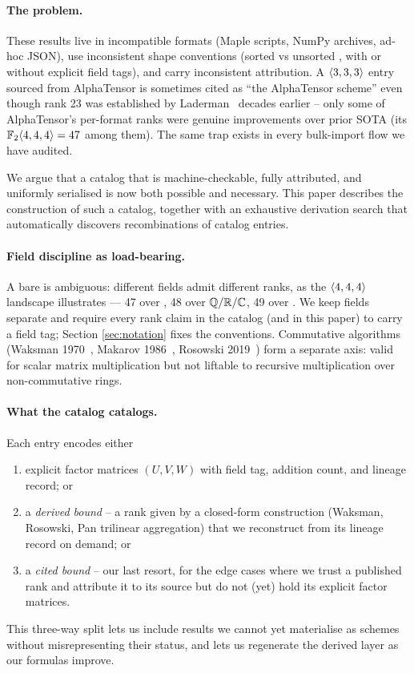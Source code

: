 \paragraph{The problem.} These results live in incompatible formats
(Maple scripts, NumPy archives, ad-hoc JSON), use inconsistent shape
conventions (sorted vs unsorted , with or without
explicit field tags), and carry inconsistent attribution. A
\(\langle 3, 3, 3 \rangle\) entry sourced from AlphaTensor is sometimes
cited as ``the AlphaTensor scheme'' even though rank 23 was established
by Laderman~\cite{laderman1976} decades earlier -- only some of
AlphaTensor's per-format ranks were genuine improvements over prior
SOTA (its \(\mathbb{F}_2\langle 4, 4, 4 \rangle=47\) among them). The same trap
exists in every bulk-import flow we have audited.

We argue that a catalog that is machine-checkable, fully
attributed, and uniformly serialised is now both possible and
necessary. This paper describes the construction of such a catalog,
together with an exhaustive derivation search that automatically discovers
recombinations of catalog entries.

\paragraph{Field discipline as load-bearing.} A bare 
is ambiguous: different fields admit different ranks, as the
\(\langle 4, 4, 4 \rangle\) landscape illustrates --- 47 over \Ftwo, 48
over \(\mathbb{Q}/\mathbb{R}/\mathbb{C}\), 49 over \Integers. We keep fields
separate and require every rank claim in the catalog (and in
this paper) to carry a field tag; Section \ref{sec:notation} fixes
the conventions. Commutative algorithms (Waksman
1970~\cite{waksman1970}, Makarov 1986~\cite{makarov1986}, Rosowski
2019~\cite{rosowski2019}) form a separate axis: valid for scalar
matrix multiplication but not liftable to recursive multiplication
over non-commutative rings.

\paragraph{What the catalog catalogs.} Each entry encodes either
\begin{enumerate}[label=(\alph*)]
  \item explicit factor matrices \((U, V, W)\) with field tag,
    addition count, and lineage record; or
  \item a \emph{derived bound} -- a rank given by a closed-form
    construction (Waksman, Rosowski, Pan trilinear aggregation) that we
    reconstruct from its lineage record on demand; or
  \item a \emph{cited bound} -- our last resort, for the edge cases
    where we trust a published rank and attribute it to its source but
    do not (yet) hold its explicit factor matrices.
\end{enumerate}
This three-way split lets us include results we cannot yet
materialise as schemes without misrepresenting their status, and lets
us regenerate the derived layer as our formulas improve.


